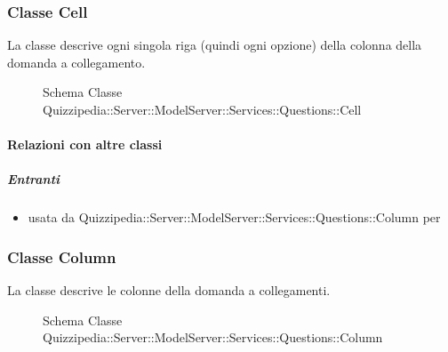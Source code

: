 \subsubsection{Classe Cell}
La classe descrive ogni singola riga (quindi ogni opzione) della colonna della domanda a collegamento.
\begin{figure}[H]
\centering
\noindent{}
\caption[Schema Classe Cell]{Schema Classe Quizzipedia::Server::ModelServer::Services::Questions::Cell}
\end{figure}
\paragraph{Relazioni con altre classi}
\subparagraph{Entranti}
\begin{itemize}
\item usata da Quizzipedia::Server::ModelServer::Services::Questions::Column per 
\end{itemize}
\subsubsection{Classe Column}
La classe descrive le colonne della domanda a collegamenti.
\begin{figure}[H]
\centering
\noindent{}
\caption[Schema Classe Column]{Schema Classe Quizzipedia::Server::ModelServer::Services::Questions::Column}
\end{figure}
